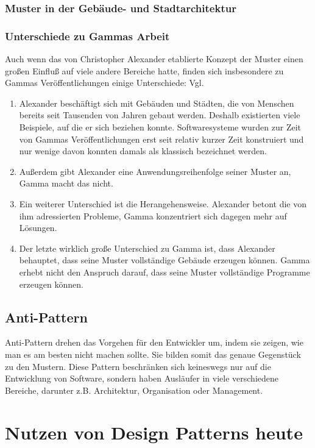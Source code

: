 \documentclass[fontsize=11pt,a4paper,final]{scrreprt}[2003/01/01]
\begin{document}
\subsection{Muster in der Gebäude- und Stadtarchitektur}

\subsection{Unterschiede zu Gammas Arbeit}
Auch wenn das von Christopher Alexander etablierte Konzept der Muster einen großen Einfluß auf viele andere Bereiche hatte, finden sich insbesondere zu Gammas Veröffentlichungen einige Unterschiede: Vgl. \cite[S. 438 - 439]{gamma2004}

\begin{enumerate} 
\item Alexander beschäftigt sich mit Gebäuden und Städten, die von Menschen bereits seit Tausenden von Jahren gebaut werden. Deshalb existierten viele Beispiele, auf die er sich beziehen konnte. Softwaresysteme wurden zur Zeit von Gammas Veröffentlichungen erst seit relativ kurzer Zeit konstruiert und nur wenige davon konnten damals als klassisch bezeichnet werden.
\item Außerdem gibt Alexander eine Anwendungsreihenfolge seiner Muster an, Gamma macht das nicht.
\item Ein weiterer Unterschied ist die Herangehensweise. Alexander betont die von ihm adressierten Probleme, Gamma konzentriert sich dagegen mehr auf Lösungen.
\item Der letzte wirklich große Unterschied zu Gamma ist, dass Alexander behauptet, dass seine Muster vollständige Gebäude erzeugen können. Gamma erhebt nicht den Anspruch darauf, dass seine Muster vollständige Programme erzeugen können.
\end{enumerate}

\section{Anti-Pattern}
Anti-Pattern drehen das Vorgehen für den Entwickler um, indem sie zeigen, wie man es am besten nicht machen sollte. Sie bilden somit das genaue Gegenstück zu den Mustern. Diese Pattern beschränken sich keineswegs nur auf die Entwicklung von Software, sondern haben Ausläufer in viele verschiedene Bereiche, darunter z.B. Architektur, Organisation oder Management. \cite{AntiPatternsCatalog}

\chapter{Nutzen von Design Patterns heute}\label{se:Design Patterns heute}
\end{document}
